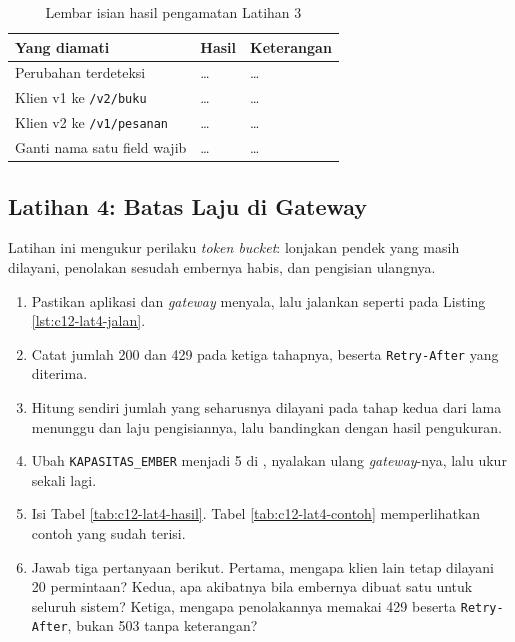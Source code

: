 \begin{table}[!htb]
  \centering
  \caption{Lembar isian hasil pengamatan Latihan 3}
  \label{tab:c12-lat3-hasil}
  \begin{tabularx}{\textwidth}{Xll}
    \hline
    \textbf{Yang diamati} & \textbf{Hasil} & \textbf{Keterangan} \\
    \hline
    Perubahan terdeteksi & \dots & \dots \\
    \hline
    Klien v1 ke \texttt{/v2/buku} & \dots & \dots \\
    \hline
    Klien v2 ke \texttt{/v1/pesanan} & \dots & \dots \\
    \hline
    Ganti nama satu field wajib & \dots & \dots \\
    \hline
  \end{tabularx}
\end{table}

\subsection*{Latihan 4: Batas Laju di Gateway}

Latihan ini mengukur perilaku \textit{token bucket}: lonjakan pendek yang
masih dilayani, penolakan sesudah embernya habis, dan pengisian ulangnya.

\begin{enumerate}
  \item Pastikan aplikasi dan \textit{gateway} menyala, lalu jalankan
         seperti pada Listing
        \ref{lst:c12-lat4-jalan}.
  \item Catat jumlah 200 dan 429 pada ketiga tahapnya, beserta
        \texttt{Retry-After} yang diterima.
  \item Hitung sendiri jumlah yang seharusnya dilayani pada tahap kedua dari
        lama menunggu dan laju pengisiannya, lalu bandingkan dengan hasil
        pengukuran.
  \item Ubah \texttt{KAPASITAS\_EMBER} menjadi 5 di ,
        nyalakan ulang \textit{gateway}-nya, lalu ukur sekali lagi.
  \item Isi Tabel \ref{tab:c12-lat4-hasil}. Tabel \ref{tab:c12-lat4-contoh}
        memperlihatkan contoh yang sudah terisi.
  \item Jawab tiga pertanyaan berikut. Pertama, mengapa klien lain tetap
        dilayani 20 permintaan? Kedua, apa akibatnya bila embernya dibuat
        satu untuk seluruh sistem? Ketiga, mengapa penolakannya memakai 429
        beserta \texttt{Retry-After}, bukan 503 tanpa keterangan?
\end{enumerate}

